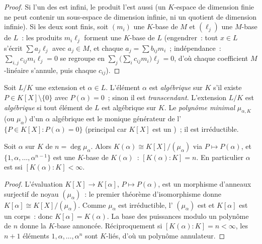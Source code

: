 \begin{proof}
Si l'un des  est infini, le produit l'est aussi (un
$K$-espace de dimension finie ne peut contenir un sous-espace de
dimension infinie, ni un quotient de dimension infinie). Si les
deux sont finis, soit $(m_i)$ une $K$-base de $M$ et $(\ell_j)$
une $M$-base de $L$~: les produits $m_i\ell_j$ forment une
$K$-base de $L$ (engendrer~: tout $x \in L$ s'écrit $\sum
a_j\ell_j$ avec $a_j \in M$, et chaque $a_j = \sum b_{ij}m_i$~;
indépendance~: $\sum_{i,j} c_{ij}m_i\ell_j = 0$ se regroupe en
$\sum_j\bigl(\sum_i c_{ij}m_i\bigr)\ell_j = 0$, d'où chaque
coefficient $M$-linéaire s'annule, puis chaque $c_{ij}$).
\end{proof}

\begin{definition}\label{def:b3:galois:algebraic}
Soit $L/K$ une extension et $\alpha \in L$. L'élément $\alpha$
est \emph{algébrique} sur $K$ s'il
existe $P \in K[X]\setminus\{0\}$ avec $P(\alpha) = 0$~; sinon
il est \emph{transcendant}. L'extension $L/K$ est
\emph{algébrique} si tout élément de $L$ est algébrique sur $K$.
Le \emph{polynôme minimal} $\mu_{\alpha,
K}$ (ou $\mu_\alpha$) d'un $\alpha$ algébrique est le monique
générateur de l' $\{P \in K[X] : P(\alpha) = 0\}$
(principal car $K[X]$ est un )~; il est irréductible.
\end{definition}

\begin{theorem}\label{thm:b3:galois:simple}
Soit $\alpha$  sur $K$ de  $n = \deg\mu_\alpha$.
Alors $K(\alpha) \cong K[X]/(\mu_\alpha)$ via $P \mapsto
P(\alpha)$, et $\{1, \alpha, \dots, \alpha^{n-1}\}$ est une
$K$-base de $K(\alpha)$~: $[K(\alpha):K] = n$. En particulier
$\alpha$ est  ssi $[K(\alpha):K] < \infty$.
\end{theorem}

\begin{proof}
L'évaluation $K[X] \to K[\alpha]$, $P \mapsto P(\alpha)$, est un
morphisme d'anneaux surjectif de noyau $(\mu_\alpha)$~: le
premier théorème d'isomorphisme donne $K[\alpha] \cong
K[X]/(\mu_\alpha)$. Comme $\mu_\alpha$ est irréductible, l'
$(\mu_\alpha)$ est  et $K[\alpha]$ est un corps~: donc
$K[\alpha] = K(\alpha)$. La base des puissances modulo un
polynôme de  $n$ donne la $K$-base annoncée. Réciproquement
si $[K(\alpha):K] = n < \infty$, les $n+1$ éléments $1, \alpha,
\dots, \alpha^n$ sont $K$-liés, d'où un polynôme annulateur.
\end{proof}

